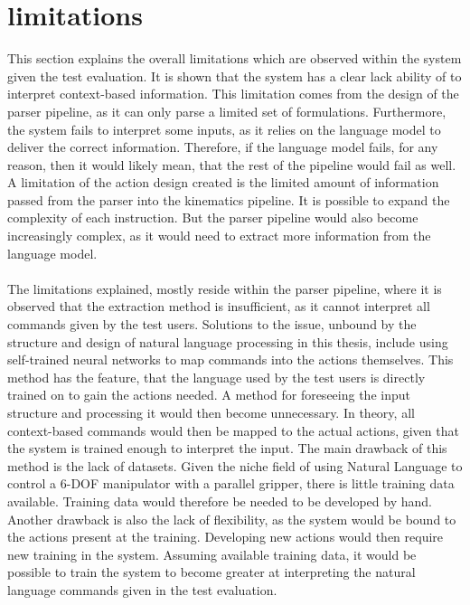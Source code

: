\section{limitations}
This section explains the overall limitations which are observed within the system given the test evaluation. It is shown that the system has a clear lack ability of to interpret context-based information. This limitation comes from the design of the parser pipeline, as it can only parse a limited set of formulations. Furthermore, the system fails to interpret some inputs, as it relies on the language model to deliver the correct information. Therefore, if the language model fails, for any reason, then it would likely mean, that the rest of the pipeline would fail as well.
A limitation of the action design created is the limited amount of information passed from the parser into the kinematics pipeline. It is possible to expand the complexity of each instruction. But the parser pipeline would also become increasingly complex, as it would need to extract more information from the language model.
\\\\
The limitations explained, mostly reside within the parser pipeline, where it is observed that the extraction method is insufficient, as it cannot interpret all commands given by the test users. Solutions to the issue, unbound by the structure and design of natural language processing in this thesis, include using self-trained neural networks to map commands into the actions themselves. This method has the feature, that the language used by the test users is directly trained on to gain the actions needed. A method for foreseeing the input structure and processing it would then become unnecessary. In theory, all context-based commands would then be mapped to the actual actions, given that the system is trained enough to interpret the input. The main drawback of this method is the lack of datasets. Given the niche field of using Natural Language to control a 6-DOF manipulator with a parallel gripper, there is little training data available. Training data would therefore be needed to be developed by hand. Another drawback is also the lack of flexibility, as the system would be bound to the actions present at the training. Developing new actions would then require new training in the system. Assuming available training data, it would be possible to train the system to become greater at interpreting the natural language commands given in the test evaluation.


